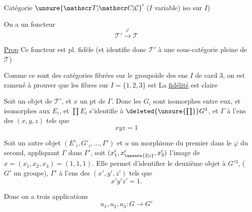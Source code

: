 Catégorie $\unsure{\mathscr T|\mathscr C|\mathcal C}'$ ($I$ variable)  iso sur $I$)

On a un foncteur
\[
\mathscr T'\xrightarrow{\varphi}\mathscr T
\]

\uline{Prop} Ce foncteur est pl. fidèle (et identifie donc  $\mathscr T'$ à une sous-catégorie pleine de $\mathscr T$)

Comme ce sont des catégories fibrées sur le groupoïde des ens $I$ de card $3$, on est ramené à prouver que  les fibres sur $I=\{1,2,3\}$  est   La \uline{fidélité} est claire

Soit  un objet de $\mathscr T'$, et $x$  un pt de $\Gamma$. Donc les $G_i$ sont isomorphes entre eux,  et isomorphes aux $E_i$, et $\prod E_i$ s'identifie à $\deleted{\unsure{\prod}}G^3$, et $\Gamma$ à l'ens des $(x,y,z)$ tels que
\[
xyz=1
\]

Soit un autre objet  $(E'_i,G'_i,\ldots,\Gamma')$ et $u$ un morphisme du  premier dans le $\varphi$ du second, appliquant $\Gamma$ dans $\Gamma'$, soit $(x'_1,x'_{\unsure{2|i}},x'_3)$ l'image de $x=(x_1,x_2,x_3)=(1,1,1)$. Elle permet d'identifier le deuxième objet à $G'{}^3$, ($G'$ un groupe), $\Gamma'$ à l'ens des $(x',y',z')$ tels que
\[
x'y'z'=1 .
\]

Donc on a trois applications
\[
u_1,u_2,u_3\colon G\longrightarrow G'
\]
